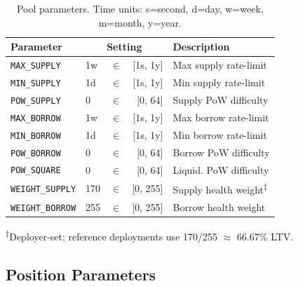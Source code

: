 \documentclass[10pt,a4paper,twocolumn]{article}
\begin{document}
\begin{table}[H]
\centering
\caption{Pool parameters. Time units: s=second, d=day, w=week, m=month, y=year.}
\label{tab:pool-params}
\small
\begin{tabularx}{0.95\columnwidth}{@{}l l@{\,}c@{\,}r X@{}}
\toprule
Parameter & \multicolumn{3}{c}{Setting} & Description \\
\midrule
\texttt{MAX\_SUPPLY} & 1w & $\in$ & [1s, 1y] & Max supply rate-limit \\
\texttt{MIN\_SUPPLY} & 1d & $\in$ & [1s, 1y] & Min supply rate-limit \\
\texttt{POW\_SUPPLY} & 0 & $\in$ & [0, 64] & Supply PoW difficulty \\
\texttt{MAX\_BORROW} & 1w & $\in$ & [1s, 1y] & Max borrow rate-limit \\
\texttt{MIN\_BORROW} & 1d & $\in$ & [1s, 1y] & Min borrow rate-limit \\
\texttt{POW\_BORROW} & 0 & $\in$ & [0, 64] & Borrow PoW difficulty \\
\texttt{POW\_SQUARE} & 0 & $\in$ & [0, 64] & Liquid. PoW difficulty \\
\texttt{WEIGHT\_SUPPLY} & 170 & $\in$ & [0, 255] & Supply health weight\textsuperscript{$\ddagger$} \\
\texttt{WEIGHT\_BORROW} & 255 & $\in$ & [0, 255] & Borrow health weight \\
\bottomrule
\end{tabularx}
\vspace{0.3em}
\par\raggedright\scriptsize\textsuperscript{$\ddagger$}Deployer-set; reference deployments use 170/255 $\approx$ 66.67\% LTV.
\end{table}

\subsection{Position Parameters}
\end{document}
